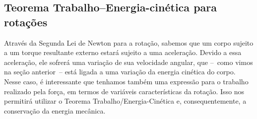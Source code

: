 \subsection{Teorema Trabalho--Energia-cinética para rotações}

Através da Segunda Lei de Newton para a rotação, sabemos que um corpo sujeito a um torque resultante externo estará sujeito a uma aceleração. Devido a essa aceleração, ele sofrerá uma variação de sua velocidade angular, que --~como vimos na seção anterior~-- está ligada a uma variação da energia cinética do corpo. Nesse caso, é interessante que tenhamos também uma expressão para o trabalho realizado pela força, em termos de variáveis características da rotação. Isso nos permitirá utilizar o Teorema Trabalho/Energia-Cinética e, consequentemente, a conservação da energia mecânica.


